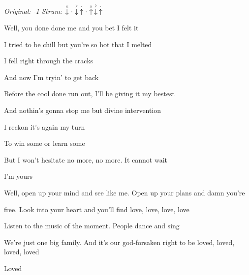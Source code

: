 \begin{song}


\begin{headerbox}
\RaiseBoxWithAccents
{} \quad
\textit{Original: -1} \quad
\textit{Strum:} $\ChuckDown\Miss\AccentDown\StaccatoUp\Miss\ChuckUp\AccentDown\StaccatoUp$
\end{headerbox}


\begin{hchordbox}
\end{hchordbox}

\bigskip

\normalsize

Well, you done done me and you bet I felt it \par
I tried to be chill but you're so hot that I melted \par
I fell right through the cracks \par
And now I'm tryin' to get back \par
Before the cool done run out, I'll be giving it my bestest \par
And nothin's gonna stop me but divine intervention \par
I reckon it's again my turn \par
To win some or learn some \par

\bigskip

But I won't hesitate no more, no more. It cannot wait \par
I'm yours    \par

\bigskip

 Well, open up your mind and see like me. Open up your plans and damn you're \par
{}free. Look into your heart and you'll find love, love, love, love \par
{}Listen to the music of the moment. People dance and sing \par
We're just one big family. And it's our god-forsaken right to be loved, loved, loved, loved \par
{}Loved \par

\bigskip


\end{song}
